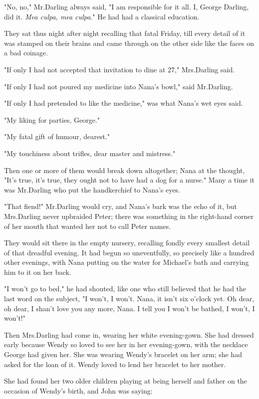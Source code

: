 "No, no," Mr.\@ Darling always said,
"I am responsible for it all.
I, George Darling, did it.
\emph{Mea culpa, mea culpa}."
He had had a classical education.

They sat thus night after night recalling that fatal Friday,
till every detail of it was stamped on their brains
and came through on the other side like the faces on a bad coinage.

"If only I had not accepted that invitation to dine at 27," Mrs.\@ Darling said.

"If only I had not poured my medicine into Nana's bowl," said Mr.\@ Darling.

"If only I had pretended to like the medicine," was what Nana's wet eyes said.

"My liking for parties, George."

"My fatal gift of humour, dearest."

"My touchiness about trifles, dear master and mistress."

Then one or more of them would break down altogether;
Nana at the thought, "It's true, it's true, they ought not to have had a dog for a nurse."
Many a time it was Mr.\@ Darling who put the handkerchief to Nana's eyes.

"That fiend!\@" Mr.\@ Darling would cry, and Nana's bark was the echo of it,
but Mrs.\@ Darling never upbraided Peter;
there was something in the right-hand corner of her mouth that wanted her not to call Peter names.

They would sit there in the empty nursery,
recalling fondly every smallest detail of that dreadful evening.
It had begun so uneventfully, so precisely like a hundred other evenings,
with Nana putting on the water for Michael's bath and carrying him to it on her back.

"I won't go to bed," he had shouted,
like one who still believed that he had the last word on the subject,
"I won't, I won't.
Nana, it isn't six o'clock yet.
Oh dear, oh dear, I shan't love you any more, Nana.
I tell you I won't be bathed, I won't, I won't!"

Then Mrs.\@ Darling had come in, wearing her white evening-gown.
She had dressed early because Wendy so loved to see her in her evening-gown,
with the necklace George had given her.
She was wearing Wendy's bracelet on her arm;
she had asked for the loan of it.
Wendy loved to lend her bracelet to her mother.

She had found her two older children playing at being herself and father on the occasion of Wendy's birth,
and John was saying:

